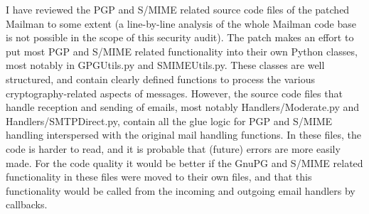 \documentclass[a4]{article}
\begin{document}
I have reviewed the PGP and S/MIME related source code files of the patched Mailman to some extent
(a line-by-line analysis of the whole Mailman code base is not possible in the scope of this security audit).
The patch makes an effort to put most PGP and S/MIME related functionality into their own Python classes, most notably in GPGUtils.py and SMIMEUtils.py.
These classes are well structured, and contain clearly defined functions to process the various cryptography-related aspects of messages.
However, the source code files that handle reception and sending of emails, most notably Handlers/Moderate.py and Handlers/SMTPDirect.py, contain all the glue logic for PGP and S/MIME handling interspersed with the original mail handling functions.
In these files, the code is harder to read, and it is probable that (future) errors are more easily made.
For the code quality it would be better if the GnuPG and S/MIME related functionality in these files were moved to their own files, and that this functionality would be called from the incoming and outgoing email handlers by callbacks.
\end{document}
